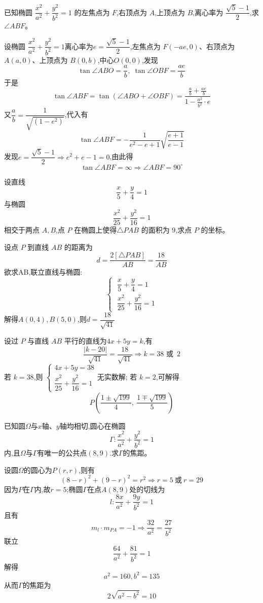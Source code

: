 \begin{questions}
    \question 已知椭圆 \(\dfrac{x^2}{a^2} + \dfrac{y^2}{b^2} = 1\) 的左焦点为 \(F\),右顶点为 \(A\),上顶点为 \(B\),离心率为 \(\dfrac{\sqrt{5}-1}{2}\),求 \(\angle ABF\)。  
    \begin{solution}
        设椭圆 \(\dfrac{x^2}{a^2} + \dfrac{y^2}{b^2} = 1\)离心率为\(e=\dfrac{\sqrt{5}-1}{2}\),左焦点为 \(F(-ae,0)\)、右顶点为 \(A(a,0)\)、上顶点为 \(B(0,b)\),中心$O(0,0)$,发现\[
        \tan \angle ABO=\frac{a}{b},\;\tan \angle OBF=\frac{ae}{b}\]于是\[
         \tan \angle ABF 
        = \tan (\angle ABO+ \angle OBF) 
        = \frac{\frac{a}{b}+\frac{ae}{b}}{1-\frac{a^2}{b^2}\cdot e} 
        \]
        又$\dfrac{a}{b}=\dfrac{1}{\sqrt{(1-e^2)}}$,代入有\[
        \tan \angle ABF = -\frac{1}{e^2-e+1}\sqrt{\frac{e+1}{e-1}}
        \]
        发现$e = \dfrac{\sqrt{5}-1}{2}\Rightarrow e^2+e-1=0$,由此得\[
        \tan \angle ABF =\infty \Rightarrow \angle ABF = 90^\circ 
        \]
    \end{solution}
    
    \question 设直线 
    \[
    \frac{x}{5}+\frac{y}{4}=1
    \]   
    与椭圆 
    \[
    \frac{x^2}{25}+\frac{y^2}{16}=1 
    \] 相交于两点 $A,B$,点 $P$ 在椭圆上使得\( \triangle PAB \) 的面积为 $9$,求点 $P$ 的坐标。
    \begin{solution}
        设点 $P$ 到直线 $AB$ 的距离为
        \[
        d = \frac{2[\triangle PAB]}{AB} = \frac{18}{AB}
        \]
        欲求AB,联立直线与椭圆:
        \[
        \begin{cases}
        \;\dfrac{x}{5}+\dfrac{y}{4}=1\\
        \;\dfrac{x^2}{25} + \dfrac{y^2}{16} = 1
        \end{cases}
        \]
        解得$A(0,4),B(5,0)$,则$d=\dfrac{18}{\sqrt{41}}$
        
        设过 $P$ 与直线 $AB$ 平行的直线为$4x + 5y = k$,有
        \[
        \frac{|k - 20|}{\sqrt{41}} = \frac{18}{\sqrt{41}} \Rightarrow k = 38 \text{ 或 } \,2
        \]
        若 $k = 38$,则      
        $\begin{cases}
        4x + 5y = 38 \\
        \dfrac{x^2}{25} + \dfrac{y^2}{16} = 1
        \end{cases}$无实数解;
        若 $k = 2$,可解得 $$P\left( \dfrac{1 \pm \sqrt{199}}{4},\ \dfrac{1 \mp \sqrt{199}}{5} \right)$$
    \end{solution}

    \question 已知圆$\Omega$与$x$轴、$y$轴均相切,圆心在椭圆$$\Gamma: \frac{x^2}{a^2} + \frac{y^2}{b^2} = 1 $$内,且$\Omega$与$\Gamma$有唯一的公共点$(8,9)$.求$\Gamma$的焦距。
    \begin{solution}
        设圆$\Omega$的圆心为$P(r,r)$,则有$$(8-r)^2+(9-r)^2=r^2\Rightarrow r=5\ \text{或} \ r=29$$
        因为$P$在$\Gamma$内,故$r=5$;椭圆$\Gamma$在点$A(8,9)$处的切线为$$l: \frac{8x}{a^2} + \frac{9y}{b^2} = 1$$
        且有$$m_l\cdot m_{PA}=-1 \Rightarrow \frac{32}{a^2}=\frac{27}{b^2}$$
        联立$$\frac{64}{a^2}+\frac{81}{b^2}=1$$解得$$a^2=160,b^2=135$$从而$\Gamma$的焦距为$$2\sqrt{a^2-b^2}=10$$
    \end{solution}


\end{questions}
